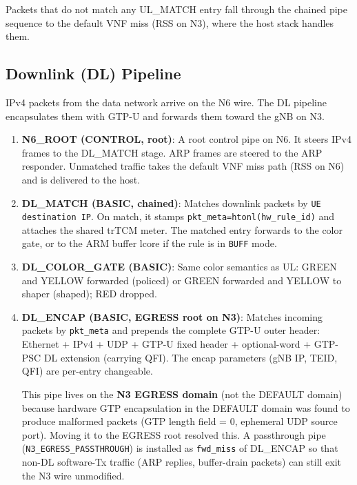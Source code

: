 \documentclass[conference]{IEEEtran}
\newcommand{\code}[1]{\nolinkurl{#1}}
\begin{document}
Packets that do not match any UL\_MATCH entry fall through the
chained pipe sequence to the default VNF miss (RSS on N3), where
the host stack handles them.

\subsection{Downlink (DL) Pipeline}

IPv4 packets from the data network arrive on the N6 wire.  The DL pipeline
encapsulates them with GTP-U and forwards them toward the gNB on N3.

\begin{enumerate}
  \item \textbf{N6\_ROOT (CONTROL, root)}: A root control pipe on N6.
        It steers IPv4 frames to the DL\_MATCH stage.  ARP frames are
        steered to the ARP responder.  Unmatched traffic takes the
        default VNF miss path (RSS on N6) and is delivered to the
        host.

  \item \textbf{DL\_MATCH (BASIC, chained)}: Matches downlink packets by
        \texttt{UE destination IP}.  On match, it stamps
        \code{pkt_meta=htonl(hw_rule_id)} and attaches the shared
        trTCM meter.  The matched entry forwards to the color gate, or to
        the ARM buffer lcore if the rule is in \texttt{BUFF} mode.

  \item \textbf{DL\_COLOR\_GATE (BASIC)}: Same color semantics as UL:
        GREEN and YELLOW forwarded (policed) or GREEN forwarded and YELLOW
        to shaper (shaped); RED dropped.

  \item \textbf{DL\_ENCAP (BASIC, EGRESS root on N3)}: Matches incoming
        packets by \texttt{pkt\_meta} and prepends the complete GTP-U outer
        header: Ethernet + IPv4 + UDP + GTP-U fixed header + optional-word
        + GTP-PSC DL extension (carrying QFI).  The encap parameters (gNB
        IP, TEID, QFI) are per-entry changeable.

        This pipe lives on the \textbf{N3 EGRESS domain} (not the DEFAULT
        domain) because hardware GTP encapsulation in the DEFAULT domain was
        found to produce malformed packets (GTP length field = 0, ephemeral
        UDP source port).  Moving it to the EGRESS root resolved this.
        A passthrough pipe (\code{N3_EGRESS_PASSTHROUGH}) is installed
        as \texttt{fwd\_miss} of DL\_ENCAP so that non-DL software-Tx
        traffic (ARP replies, buffer-drain packets) can still exit the N3
        wire unmodified.
\end{enumerate}
\end{document}
